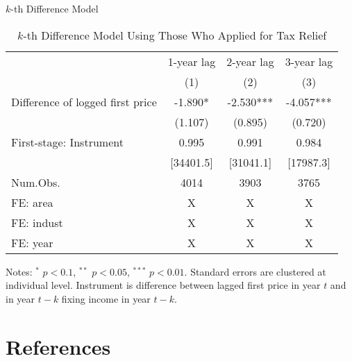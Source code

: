 \documentclass[
  ignorenonframetext,
  aspectratio=169,
]{beamer}
\begin{document}
\begin{frame}{\(k\)-th Difference Model}
\protect\hypertarget{k-th-difference-model}{}
\begin{table}

\caption{\label{tab:KdiffElasticity}$k$-th Difference Model Using Those Who Applied for Tax Relief}
\centering
\fontsize{8}{10}\selectfont
\begin{threeparttable}
\begin{tabular}[t]{lccc}
\toprule
\multicolumn{1}{c}{ } & \multicolumn{1}{c}{1-year lag} & \multicolumn{1}{c}{2-year lag} & \multicolumn{1}{c}{3-year lag} \\
\cmidrule(l{3pt}r{3pt}){2-2} \cmidrule(l{3pt}r{3pt}){3-3} \cmidrule(l{3pt}r{3pt}){4-4}
  & (1) & (2) & (3)\\
\midrule
Difference of logged first price & -1.890* & -2.530*** & -4.057***\\
 & (1.107) & (0.895) & (0.720)\\
\midrule
First-stage: Instrument & 0.995 & 0.991 & 0.984\\
 & [34401.5] & [31041.1] & [17987.3]\\
Num.Obs. & 4014 & 3903 & 3765\\
FE: area & X & X & X\\
FE: indust & X & X & X\\
FE: year & X & X & X\\
\bottomrule
\end{tabular}
\begin{tablenotes}
\item Notes: $^{*}$ $p < 0.1$, $^{**}$ $p < 0.05$, $^{***}$ $p < 0.01$. Standard errors are clustered at individual level. Instrument is difference between lagged first price in year $t$ and in year $t - k$ fixing income in year $t - k$.
\end{tablenotes}
\end{threeparttable}
\end{table}
\end{frame}

\hypertarget{references}{%
\section*{References}\label{references}}
\end{document}
